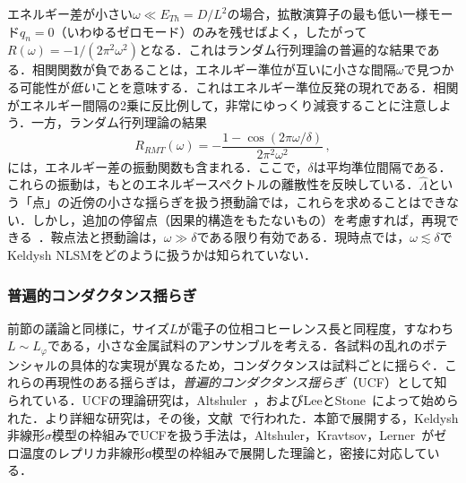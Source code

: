 \documentclass[a4paper,11pt]{ltjsarticle}
\begin{document}
エネルギー差が小さい$\omega\ll E_{Th}=D/L^{2}$の場合，拡散演算子の最も低い一様モード$q_{n}=0$（いわゆるゼロモード）のみを残せばよく，したがって$R(\omega)=
-1/(2\pi^2\omega^2)$となる．これはランダム行列理論の普遍的な結果である．相関関数が負であることは，エネルギー準位が互いに小さな間隔$\omega$で見つかる可能性が{\em 低い}ことを意味する．これはエネルギー準位反発の現れである．相関がエネルギー間隔の2乗に反比例して，非常にゆっくり減衰することに注意しよう．一方，ランダム行列理論の結果~\cite{Mehta}
\begin{equation}
R_{RMT}(\omega)=-\frac{1-\cos(2\pi\omega/\delta)}{2\pi^2\omega^2}\,,
\end{equation}
には，エネルギー差の振動関数も含まれる．ここで，$\delta$は平均準位間隔である．これらの振動は，もとのエネルギースペクトルの離散性を反映している．$\hat{\Lambda}$という「点」の近傍の小さな揺らぎを扱う摂動論では，これらを求めることはできない．しかし，追加の停留点（因果的構造をもたないもの）を考慮すれば，再現できる~\cite{Altland:2000fj}．鞍点法と摂動論は，$\omega\gg
\delta$である限り有効である．現時点では，$\omega\lesssim \delta$でKeldysh NLSMをどのように扱うかは知られていない．




\subsubsection{普遍的コンダクタンス揺らぎ}\label{Part-II-3}



前節の議論と同様に，サイズ$L$が電子の位相コヒーレンス長と同程度，すなわち$L\sim L_{\varphi}$である，小さな金属試料のアンサンブルを考える．各試料の乱れのポテンシャルの具体的な実現が異なるため，コンダクタンスは試料ごとに揺らぐ．これらの再現性のある揺らぎは，{\em 普遍的コンダクタンス揺らぎ}（UCF）として知られている．UCFの理論研究は，Altshuler~\cite{Altshuler-UCF}，およびLeeとStone~\cite{LeeStone}によって始められた．より詳細な研究は，その後，文献~\cite{AltshulerShklovskii,Lee:1987zzc}で行われた．本節で展開する，Keldysh非線形$\sigma$模型の枠組みでUCFを扱う手法は，Altshuler，Kravtsov，Lerner~\cite{AKL-UCF}がゼロ温度のレプリカ非線形σ模型の枠組みで展開した理論と，密接に対応している．
\end{document}

